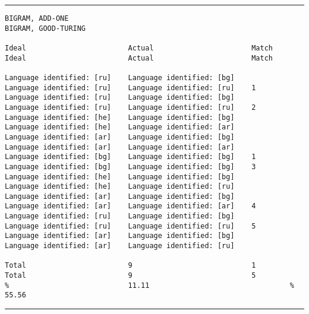\tiny
\hrule\vskip4pt
\begin{verbatim}
BIGRAM, ADD-ONE                                                    BIGRAM, GOOD-TURING

Ideal                        Actual                       Match    Ideal                        Actual                       Match

Language identified: [ru]    Language identified: [bg]             Language identified: [ru]    Language identified: [ru]    1
Language identified: [ru]    Language identified: [bg]             Language identified: [ru]    Language identified: [ru]    2
Language identified: [he]    Language identified: [bg]             Language identified: [he]    Language identified: [ar]
Language identified: [ar]    Language identified: [bg]             Language identified: [ar]    Language identified: [ar]
Language identified: [bg]    Language identified: [bg]    1        Language identified: [bg]    Language identified: [bg]    3
Language identified: [he]    Language identified: [bg]             Language identified: [he]    Language identified: [ru]
Language identified: [ar]    Language identified: [bg]             Language identified: [ar]    Language identified: [ar]    4
Language identified: [ru]    Language identified: [bg]             Language identified: [ru]    Language identified: [ru]    5
Language identified: [ar]    Language identified: [bg]             Language identified: [ar]    Language identified: [ru]

Total                        9                            1        Total                        9                            5
%                            11.11                                 %                            55.56
\end{verbatim}
\vskip4pt\hrule

\clearpage

